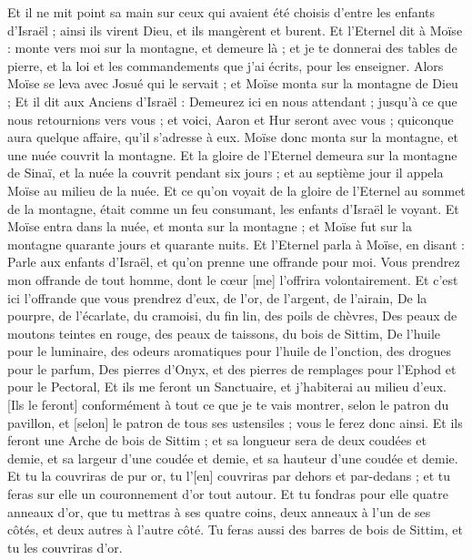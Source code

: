 \begin{multicols}{2}
Et il ne mit point sa main sur ceux qui avaient été choisis d'entre les enfants d'Israël ; ainsi ils virent Dieu, et ils mangèrent et burent.
Et l'Eternel dit à Moïse : monte vers moi sur la montagne, et demeure là ; et je te donnerai des tables de pierre, et la loi et les commandements que j'ai écrits, pour les enseigner.
Alors Moïse se leva avec Josué qui le servait ; et Moïse monta sur la montagne de Dieu ;
Et il dit aux Anciens d'Israël : Demeurez ici en nous attendant ; jusqu'à ce que nous retournions vers vous ; et voici, Aaron et Hur seront avec vous ; quiconque aura quelque affaire, qu'il s'adresse à eux.
Moïse donc monta sur la montagne, et une nuée couvrit la montagne.
Et la gloire de l'Eternel demeura sur la montagne de Sinaï, et la nuée la couvrit pendant six jours ; et au septième jour il appela Moïse au milieu de la nuée.
Et ce qu'on voyait de la gloire de l'Eternel au sommet de la montagne, était comme un feu consumant, les enfants d'Israël le voyant.
Et Moïse entra dans la nuée, et monta sur la montagne ; et Moïse fut sur la montagne quarante jours et quarante nuits.
\VerseOne{}Et l'Eternel parla à Moïse, en disant :
Parle aux enfants d'Israël, et qu'on prenne une offrande pour moi. Vous prendrez mon offrande de tout homme, dont le cœur [me] l'offrira volontairement.
Et c'est ici l'offrande que vous prendrez d'eux, de l'or, de l'argent, de l'airain,
De la pourpre, de l'écarlate, du cramoisi, du fin lin, des poils de chèvres,
Des peaux de moutons teintes en rouge, des peaux de taissons, du bois de Sittim,
De l'huile pour le luminaire, des odeurs aromatiques pour l'huile de l'onction, des drogues pour le parfum,
Des pierres d'Onyx, et des pierres de remplages pour l'Ephod et pour le Pectoral,
Et ils me feront un Sanctuaire, et j'habiterai au milieu d'eux.
[Ils le feront] conformément à tout ce que je te vais montrer, selon le patron du pavillon, et [selon] le patron de tous ses ustensiles ; vous le ferez donc ainsi.
Et ils feront une Arche de bois de Sittim ; et sa longueur sera de deux coudées et demie, et sa largeur d'une coudée et demie, et sa hauteur d'une coudée et demie.
Et tu la couvriras de pur or, tu l'[en] couvriras par dehors et par-dedans ; et tu feras sur elle un couronnement d'or tout autour.
Et tu fondras pour elle quatre anneaux d'or, que tu mettras à ses quatre coins, deux anneaux à l'un de ses côtés, et deux autres à l'autre côté.
Tu feras aussi des barres de bois de Sittim, et tu les couvriras d'or.

\end{multicols}
